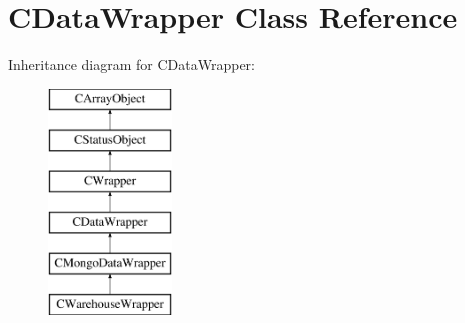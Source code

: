 \hypertarget{class_c_data_wrapper}{\section{C\-Data\-Wrapper Class Reference}
\label{class_c_data_wrapper}
}
Inheritance diagram for C\-Data\-Wrapper\-:\begin{figure}[H]
\begin{center}
\leavevmode
\includegraphics[height=6.000000cm]{class_c_data_wrapper}
\end{center}
\end{figure}
